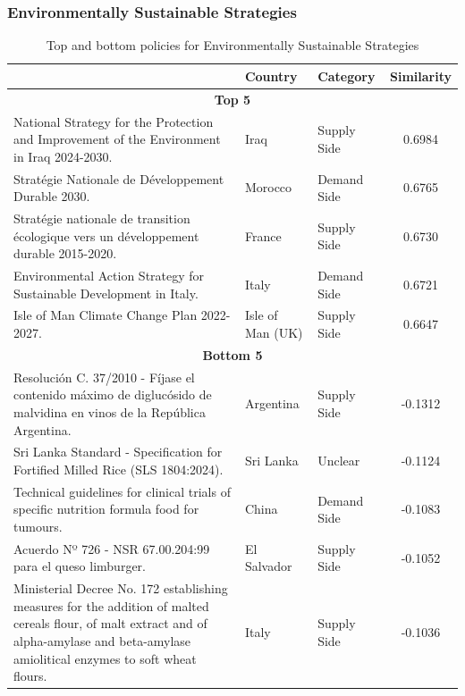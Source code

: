\subsubsection{Environmentally Sustainable Strategies}
\begin{table}[htbp]
\centering
\begin{tabular}{l l l c}
\toprule
 & Country & Category & Similarity \\
\midrule
\multicolumn{4}{c}{\textbf{Top 5}} \\
National Strategy for the Protection and Improvement of the Environment in Iraq 2024-2030. & Iraq & Supply Side & 0.6984 \\
Stratégie Nationale de Développement Durable 2030. & Morocco & Demand Side & 0.6765 \\
Stratégie nationale de transition écologique vers un développement durable 2015-2020. & France & Supply Side & 0.6730 \\
Environmental Action Strategy for Sustainable Development in Italy. & Italy & Demand Side & 0.6721 \\
Isle of Man Climate Change Plan 2022-2027. & Isle of Man (UK) & Supply Side & 0.6647 \\
\midrule
\multicolumn{4}{c}{\textbf{Bottom 5}} \\
Resolución C. 37/2010 - Fíjase el contenido máximo de diglucósido de malvidina en vinos de la República Argentina. & Argentina & Supply Side & -0.1312 \\
Sri Lanka Standard - Specification for Fortified Milled Rice (SLS 1804:2024). & Sri Lanka & Unclear & -0.1124 \\
Technical guidelines for clinical trials of   specific nutrition formula food for  tumours. & China & Demand Side & -0.1083 \\
Acuerdo Nº 726 - NSR 67.00.204:99 para el queso limburger. & El Salvador & Supply Side & -0.1052 \\
Ministerial Decree No. 172 establishing measures for the addition of malted cereals flour, of malt extract and of alpha-amylase and beta-amylase amiolitical enzymes to soft wheat flours. & Italy & Supply Side & -0.1036 \\
\bottomrule
\end{tabular}
\caption{Top and bottom policies for Environmentally Sustainable Strategies}
\label{tab:top_bottom_sus}
\end{table}

